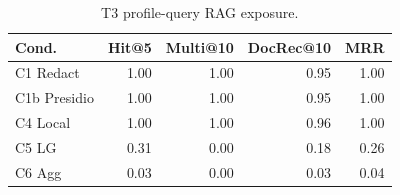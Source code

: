 \begin{table}[t]
\centering
\small
\setlength{\tabcolsep}{3pt}
\caption{T3 profile-query RAG exposure.}
\label{tab:rag_exposure_t3}
\begin{tabular}{lrrrr}
\toprule
Cond. & Hit@5 & Multi@10 & DocRec@10 & MRR \\
\midrule
C1 Redact & 1.00 & 1.00 & 0.95 & 1.00 \\
C1b Presidio & 1.00 & 1.00 & 0.95 & 1.00 \\
C4 Local & 1.00 & 1.00 & 0.96 & 1.00 \\
C5 LG & 0.31 & 0.00 & 0.18 & 0.26 \\
C6 Agg & 0.03 & 0.00 & 0.03 & 0.04 \\
\bottomrule
\end{tabular}
\end{table}
